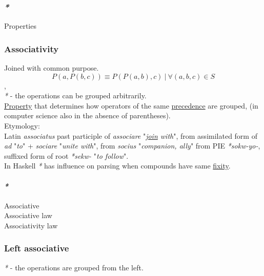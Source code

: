 \documentclass[11pt]{article}
\begin{document}
\subsubsection{\emph{*}}
\label{sec:org4ba250a}

\label{org763ad6b}Properties\\

\subsubsection{\label{org8a2c45d}Associativity}
\label{sec:orgaffb43a}
Joined with common purpose.\\

$$ P(a,P(b,c)) \equiv P(P(a,b),c) \ | \ \forall (a,b,c) \in S $$,\\

\emph{*} - the operations can be grouped arbitrarily.\\

\hyperref[org07ca26b]{Property} that determines how operators of the same \hyperref[orgd18f0db]{precedence} are grouped, (in computer science also in the absence of parentheses).\\

Etymology:\\
Latin \emph{associatus} past participle of \emph{associare} "\emph{\hyperref[orgcf84bcb]{join} with}", from assimilated form of \emph{ad} "\emph{to}" + \emph{sociare} "\emph{unite with}", from \emph{socius} "\emph{companion, ally}" from PIE \emph{*sokw-yo-}, suffixed form of root \emph{*sekw-} "\emph{to follow}".\\

In Haskell \emph{*} has influence on parsing when compounds have same \hyperref[org9303da2]{fixity}.\\

\paragraph{\emph{*}}
\label{sec:org5984feb}

\label{org31bffbb}Associative\\
\label{orgf047771}Associative law\\
\label{org0e2dd42}Associativity law\\

\subsubsection{\label{org30047ac}Left associative}
\label{sec:org64e0b30}
\emph{*} - the operations are grouped from the left.\\
\end{document}
